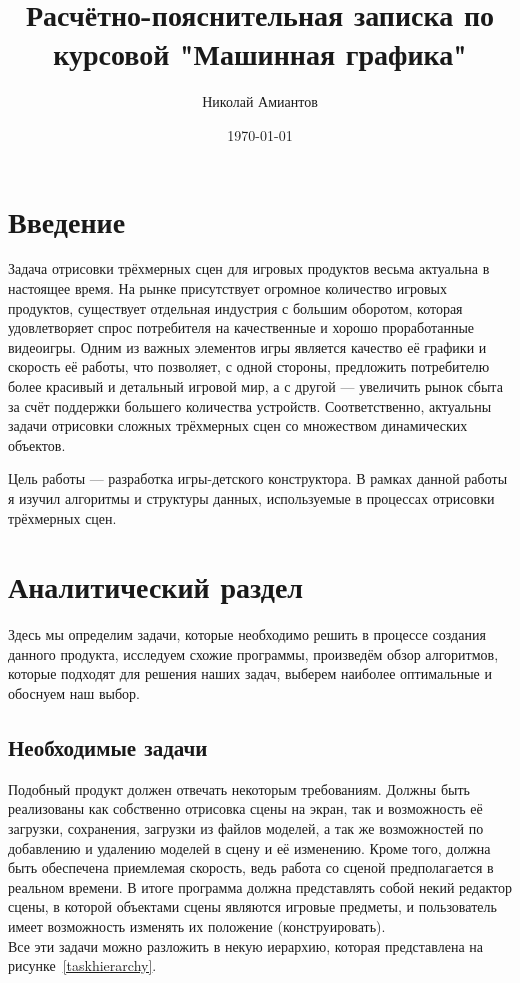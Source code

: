 \documentclass[a4paper,12pt]{report}
\title{Расчётно-пояснительная записка по курсовой "Машинная графика"}
\author{Николай Амиантов}
\date{\today}
\numberwithin{equation}{section}
\begin{document}
\maketitle

\section*{Введение}
Задача отрисовки трёхмерных сцен для игровых продуктов весьма актуальна в настоящее время. На рынке присутствует огромное количество игровых продуктов, существует отдельная индустрия с большим оборотом, которая удовлетворяет спрос потребителя на качественные и хорошо проработанные видеоигры. Одним из важных элементов игры является качество её графики и скорость её работы, что позволяет, с одной стороны, предложить потребителю более красивый и детальный игровой мир, а с другой --- увеличить рынок сбыта за счёт поддержки большего количества устройств. Соответственно, актуальны задачи отрисовки сложных трёхмерных сцен со множеством динамических объектов.

Цель работы --- разработка игры-детского конструктора. В рамках данной работы я изучил алгоритмы и структуры данных, используемые в процессах отрисовки трёхмерных сцен.

\section{Аналитический раздел}
Здесь мы определим задачи, которые необходимо решить в процессе создания данного продукта, исследуем схожие программы, произведём обзор алгоритмов, которые подходят для решения наших задач, выберем наиболее оптимальные и обоснуем наш выбор.

\subsection{Необходимые задачи}
Подобный продукт должен отвечать некоторым требованиям. Должны быть реализованы как собственно отрисовка сцены на экран, так и возможность её загрузки, сохранения, загрузки из файлов моделей, а так же возможностей по добавлению и удалению моделей в сцену и её изменению. Кроме того, должна быть обеспечена приемлемая скорость, ведь работа со сценой предполагается в реальном времени. В итоге программа должна представлять собой некий редактор сцены, в которой объектами сцены являются игровые предметы, и пользователь имеет возможность изменять их положение (конструировать).  \\
Все эти задачи можно разложить в некую иерархию, которая представлена на рисунке~\ref{taskhierarchy}.
\end{document}
